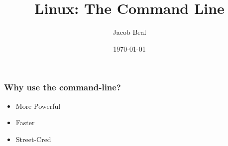 \documentclass{beamer}
\title[Learning Linux]{Linux: The Command Line}
\author{Jacob Beal}
\date{\today}
\begin{document}
\frame{\titlepage}
\begin{frame}
    \frametitle{Why use the command-line?}
    \begin{itemize}
        \item<1-> More Powerful
        \item<2-> Faster
        \item<3-> Street-Cred
    \end{itemize}
\end{frame}
\end{document}
